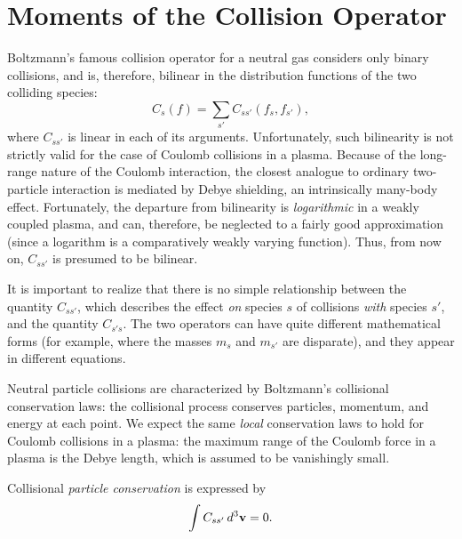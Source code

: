 \section{Moments of the Collision Operator}\label{s3.3}
Boltzmann's famous collision operator for a neutral gas considers only
binary collisions, and is, therefore, bilinear in the distribution functions
of the two colliding species:
\begin{equation}
C_s(f) =\sum_{s'} C_{ss'}(f_s, f_{s'}),
\end{equation}
where $C_{ss'}$ is linear in each of its arguments. Unfortunately, such bilinearity
is not strictly valid for the case of Coulomb collisions in a plasma. 
Because of the long-range nature of the Coulomb interaction, the closest analogue
to ordinary two-particle interaction is mediated by Debye shielding, an intrinsically
many-body effect. Fortunately, the departure from bilinearity is {\em logarithmic}\/
in a weakly coupled plasma, and can, therefore,  be neglected to a fairly good approximation
(since a logarithm is a comparatively weakly varying function). 
Thus, from now
on, $C_{ss'}$ is presumed to be bilinear. 

It is important to realize that there is no simple relationship between
the quantity 
$C_{ss'}$, which describes the effect {\em on}\/ species $s$ of
collisions {\em with}\/ species $s'$, and the quantity $C_{s's}$. The two operators
can have quite different mathematical forms (for example, where the masses
$m_s$ and $m_{s'}$ are disparate), and they appear in different equations. 

Neutral particle collisions are characterized by Boltzmann's collisional
conservation laws: the collisional process conserves particles, momentum,
and energy at each point. We expect the same {\em local}\/ conservation
laws to hold for Coulomb collisions in a plasma: the maximum range of the
Coulomb force in a plasma is the Debye length, which is assumed to
be vanishingly small.

Collisional {\em particle conservation}\/ is expressed by
\begin{equation}
\int C_{ss'} \,d^3{\bf v} =0.
\end{equation}

